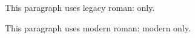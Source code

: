 This paragraph uses legacy roman: \rm only.

This paragraph uses modern roman: \textrm{modern} only.

